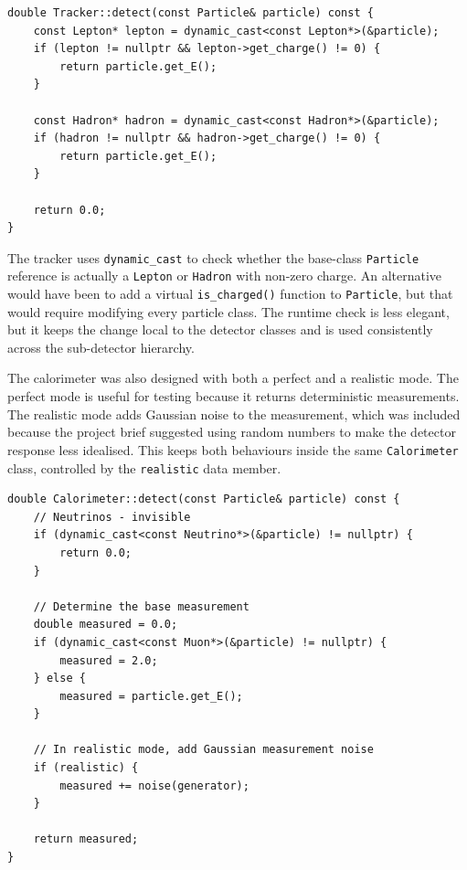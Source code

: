 \documentclass[11pt,a4paper]{article}
\begin{document}
\begin{lstlisting}[caption={Detector-specific response logic in \texttt{Tracker::detect}.}, label={lst:trackerdetect}]
double Tracker::detect(const Particle& particle) const {
    const Lepton* lepton = dynamic_cast<const Lepton*>(&particle);
    if (lepton != nullptr && lepton->get_charge() != 0) {
        return particle.get_E();
    }

    const Hadron* hadron = dynamic_cast<const Hadron*>(&particle);
    if (hadron != nullptr && hadron->get_charge() != 0) {
        return particle.get_E();
    }

    return 0.0;
}
\end{lstlisting}

The tracker uses \texttt{dynamic\_cast} to check whether the base-class \texttt{Particle} reference is actually a \texttt{Lepton} or \texttt{Hadron} with non-zero charge. An alternative would have been to add a virtual \texttt{is\_charged()} function to \texttt{Particle}, but that would require modifying every particle class. The runtime check is less elegant, but it keeps the change local to the detector classes and is used consistently across the sub-detector hierarchy.

The calorimeter was also designed with both a perfect and a realistic mode. The perfect mode is useful for testing because it returns deterministic measurements. The realistic mode adds Gaussian noise to the measurement, which was included because the project brief suggested using random numbers to make the detector response less idealised. This keeps both behaviours inside the same \texttt{Calorimeter} class, controlled by the \texttt{realistic} data member.

\begin{lstlisting}[caption={Perfect and realistic calorimeter response in \texttt{Calorimeter::detect}.}, label={lst:calorimeterdetect}]
double Calorimeter::detect(const Particle& particle) const {
    // Neutrinos - invisible
    if (dynamic_cast<const Neutrino*>(&particle) != nullptr) {
        return 0.0;
    }

    // Determine the base measurement
    double measured = 0.0;
    if (dynamic_cast<const Muon*>(&particle) != nullptr) {
        measured = 2.0;
    } else {
        measured = particle.get_E();
    }

    // In realistic mode, add Gaussian measurement noise
    if (realistic) {
        measured += noise(generator);
    }

    return measured;
}
\end{lstlisting}
\end{document}
